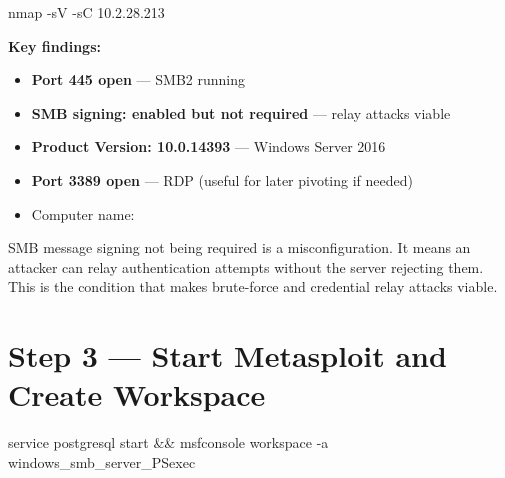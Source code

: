 \begin{termbox}
nmap -sV -sC 10.2.28.213
\end{termbox}

\textbf{Key findings:}
\begin{itemize}
  \item \textbf{Port 445 open} --- SMB2 running
  \item \textbf{SMB signing: enabled but not required} --- relay attacks viable
  \item \textbf{Product Version: 10.0.14393} --- Windows Server 2016
  \item \textbf{Port 3389 open} --- RDP (useful for later pivoting if needed)
  \item Computer name: 
\end{itemize}

\begin{whybox}
SMB message signing not being required is a misconfiguration. It means an
attacker can relay authentication attempts without the server rejecting them.
This is the condition that makes brute-force and credential relay attacks viable.
\end{whybox}


\section*{Step 3 --- Start Metasploit and Create Workspace}



\begin{termbox}
service postgresql start && msfconsole
workspace -a windows_smb_server_PSexec
\end{termbox}

